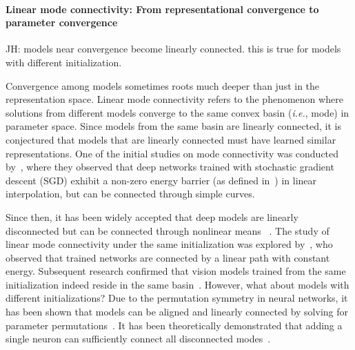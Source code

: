 \documentclass{article}
\newcommand{\jh}[1]{{\;\color{red}JH: #1}}
\theoremstyle{plain}
\theoremstyle{definition}
\theoremstyle{remark}
\begin{document}


\paragraph{Linear mode connectivity: From representational convergence to parameter convergence}
\jh{models near convergence become linearly connected. this is true for models with different initialization.}


Convergence among models sometimes roots much deeper than just in the representation space. 
Linear mode connectivity refers to the phenomenon where solutions from different models converge to the same convex basin (\emph{i.e.}, mode) in parameter space. Since models from the same basin are linearly connected, it is conjectured that models that are linearly connected must have learned similar representations. One of the initial studies on mode connectivity was conducted by~\cite{garipov2018loss}, where they observed that deep networks trained with stochastic gradient descent (SGD) exhibit a non-zero energy barrier (as defined in~\cite{draxler2018essentially}) in linear interpolation, but can be connected through simple curves.

Since then, it has been widely accepted that deep models are linearly disconnected but can be connected through nonlinear means
~\cite{freeman2016topology,draxler2018essentially,fort2019large}.
The study of linear mode connectivity under the same initialization was explored by~\cite{nagarajan2019uniform}, who observed that trained networks are connected by a linear path with constant energy. Subsequent research confirmed that vision models trained from the same initialization indeed reside in the same basin~\cite{frankle2020linear}. However, what about models with different initializations? Due to the permutation symmetry in neural networks, it has been shown that models can be aligned and linearly connected by solving for parameter permutations~\cite{brea2019weight,tatro2020optimizing,entezari2021role}.
It has been theoretically demonstrated that adding a single neuron can sufficiently connect all disconnected modes~\cite{simsek2021geometry}.
\end{document}
